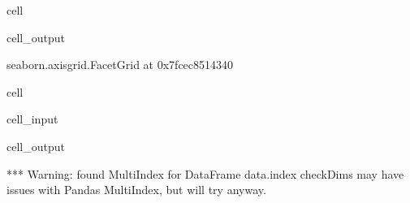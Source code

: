\documentclass[letterpaper,table,10pt,english]{jupyterBook}
\begin{document}
\begin{sphinxuseclass}{cell}
\begin{sphinxVerbatimOutput}
\begin{sphinxuseclass}{cell_output}
\begin{sphinxVerbatim}[commandchars=\\\{\}]
\PYGZlt{}seaborn.axisgrid.FacetGrid at 0x7fcec8514340\PYGZgt{}
\end{sphinxVerbatim}

\noindent{}

\end{sphinxuseclass}\end{sphinxVerbatimOutput}

\end{sphinxuseclass}
\begin{sphinxuseclass}{cell}\begin{sphinxVerbatimInput}

\begin{sphinxuseclass}{cell_input}
\begin{sphinxVerbatim}[commandchars=\\\{\}]
   
       
                      
\end{sphinxVerbatim}

\end{sphinxuseclass}\end{sphinxVerbatimInput}
\begin{sphinxVerbatimOutput}

\begin{sphinxuseclass}{cell_output}
\begin{sphinxVerbatim}[commandchars=\\\{\}]
*** Warning: found MultiIndex for DataFrame data.index \PYGZhy{} checkDims may have issues with Pandas MultiIndex, but will try anyway.
\end{sphinxVerbatim}


\end{sphinxuseclass}
\end{sphinxVerbatimOutput}
\end{sphinxuseclass}
\end{document}
